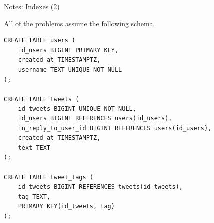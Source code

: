 \documentclass[12pt]{exam}
\theoremstyle{definition}
\begin{document}
\begin{center}
    {
\Large
Notes: Indexes (2)
}
\end{center}

\noindent
All of the problems assume the following schema.
\begin{lstlisting}
CREATE TABLE users (
    id_users BIGINT PRIMARY KEY,
    created_at TIMESTAMPTZ,
    username TEXT UNIQUE NOT NULL
);

CREATE TABLE tweets (
    id_tweets BIGINT UNIQUE NOT NULL,
    id_users BIGINT REFERENCES users(id_users),
    in_reply_to_user_id BIGINT REFERENCES users(id_users),
    created_at TIMESTAMPTZ,
    text TEXT
);

CREATE TABLE tweet_tags (
    id_tweets BIGINT REFERENCES tweets(id_tweets),
    tag TEXT,
    PRIMARY KEY(id_tweets, tag)
);
\end{lstlisting}
\end{document}
